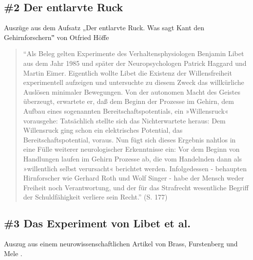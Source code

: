 \documentclass[
  a4paper,
]{report}
\begin{document}
\hypertarget{def-expert-ev2}{%
\subsection{\#2 Der entlarvte Ruck}\label{def-expert-ev2}}

Auszüge aus dem Aufsatz „Der entlarvte Ruck. Was sagt Kant den Gehirnforschern‟ von Otfried Höffe \citeyearpar{Höffe2004}

\begin{quote}
``Als Beleg gelten Experimente des Verhaltensphysiologen Benjamin Libet aus dem Jahr 1985 und später der Neuropsychologen Patrick Haggard und Martin Eimer. Eigentlich wollte Libet die Existenz der Willensfreiheit experimentell aufzeigen und untersuchte zu diesem Zweck das willkürliche Auslösen minimaler Bewegungen. Von der autonomen Macht des Geistes überzeugt, erwartete er, daß dem Beginn der Prozesse im Gehirn, dem Aufbau eines sogenannten Bereitschaftspotentials, ein »Willensruck« vorausgehe: Tatsächlich stellte sich das Nichterwartete heraus: Dem Willensruck ging schon ein elektrisches Potential, das Bereitschaftspotential, voraus. Nun fügt sich dieses Ergebnis nahtlos in eine Fülle weiterer neurologischer Erkenntnisse ein: Vor dem Beginn von Handlungen laufen im Gehirn Prozesse ab, die vom Handelnden dann als »willentlich selbst verursacht« berichtet werden. Infolgedessen - behaupten Hirnforscher wie Gerhard Roth und Wolf Singer - habe der Mensch weder Freiheit noch Verantwortung, und der für das Strafrecht wesentliche Begriff der Schuldfähigkeit verliere sein Recht.'' (S. 177)
\end{quote}

\hypertarget{def-expert-ev3}{%
\subsection{\#3 Das Experiment von Libet et al.~}\label{def-expert-ev3}}

Auszug aus einem neurowissenschaftlichen Artikel von Brass, Furstenberg und Mele \citeyearpar{Brass2019}.
\end{document}
